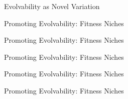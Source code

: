 \begin{frame}{Evolvability as Novel Variation}
  
\end{frame}

\begin{frame}{Promoting Evolvability: Fitness Niches}
	
\end{frame}

\begin{frame}{Promoting Evolvability: Fitness Niches}
\vfill
	
    \vfill
\end{frame}

\begin{frame}{Promoting Evolvability: Fitness Niches}
\vspace{2ex}
	
\end{frame}

\begin{frame}{Promoting Evolvability: Fitness Niches}
\vspace{2ex}	

\end{frame}

\begin{frame}{Promoting Evolvability: Fitness Niches}
	
\end{frame}
